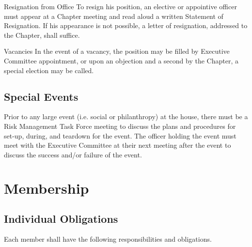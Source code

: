 \documentclass{article}
\begin{document}
\begin{subsubsectionList}
  \item {\titleStyle Resignation from Office\titleSuffix}
  To resign his position, an elective or appointive officer must appear at a
  Chapter meeting and read aloud a written Statement of Resignation. If his
  appearance is not possible, a letter of resignation, addressed to the Chapter,
  shall suffice.

  \item {\titleStyle Vacancies\titleSuffix}
  In the event of a vacancy, the position may be filled by Executive Committee
  appointment, or upon an objection and a second by the Chapter, a special
  election may be called.
\end{subsubsectionList}

\subsection{Special Events}

Prior to any large event (i.e. social or philanthropy) at the house, there must
be a Risk Management Task Force meeting to discuss the plans and procedures for
set-up, during, and teardown for the event. The officer holding the event must
meet with the Executive Committee at their next meeting after the event to
discuss the success and/or failure of the event.

\section{Membership}

\subsection{Individual Obligations}

Each member shall have the following responsibilities and obligations.
\end{document}

